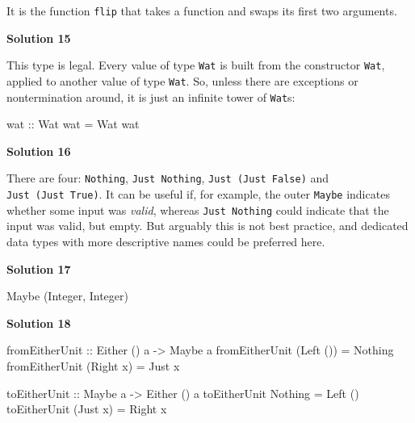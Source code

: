 \documentclass[11pt,
  american,
  DIV13]{article}
\newenvironment{Shaded}{}{}
\newcommand{\DataTypeTok}[1]{\textcolor[rgb]{0.56,0.13,0.00}{#1}}
\newcommand{\NormalTok}[1]{#1}
\newcommand{\OtherTok}[1]{\textcolor[rgb]{0.00,0.44,0.13}{#1}}
\begin{document}
It is the function \texttt{flip} that takes a function and swaps its
first two arguments.

\textbf{Solution 15}

This type is legal. Every value of type \texttt{Wat} is built from the
constructor \texttt{Wat}, applied to another value of type \texttt{Wat}.
So, unless there are exceptions or nontermination around, it is just an
infinite tower of \texttt{Wat}s:

\begin{Shaded}
\begin{Highlighting}[]
\OtherTok{wat ::} \DataTypeTok{Wat}
\NormalTok{wat }\OtherTok{=} \DataTypeTok{Wat}\NormalTok{ wat}
\end{Highlighting}
\end{Shaded}

\textbf{Solution 16}

There are four: \texttt{Nothing}, \texttt{Just\ Nothing},
\texttt{Just\ (Just\ False)} and \texttt{Just\ (Just\ True)}. It can be
useful if, for example, the outer \texttt{Maybe} indicates whether some
input was \emph{valid}, whereas \texttt{Just\ Nothing} could indicate
that the input was valid, but empty. But arguably this is not best
practice, and dedicated data types with more descriptive names could be
preferred here.

\textbf{Solution 17}

\begin{Shaded}
\begin{Highlighting}[]
\DataTypeTok{Maybe}\NormalTok{ (}\DataTypeTok{Integer}\NormalTok{, }\DataTypeTok{Integer}\NormalTok{)}
\end{Highlighting}
\end{Shaded}

\textbf{Solution 18}

\begin{Shaded}
\begin{Highlighting}[]
\OtherTok{fromEitherUnit ::} \DataTypeTok{Either}\NormalTok{ () a }\OtherTok{{-}\textgreater{}} \DataTypeTok{Maybe}\NormalTok{ a}
\NormalTok{fromEitherUnit (}\DataTypeTok{Left}\NormalTok{ ()) }\OtherTok{=} \DataTypeTok{Nothing}
\NormalTok{fromEitherUnit (}\DataTypeTok{Right}\NormalTok{ x) }\OtherTok{=} \DataTypeTok{Just}\NormalTok{ x}

\OtherTok{toEitherUnit ::} \DataTypeTok{Maybe}\NormalTok{ a }\OtherTok{{-}\textgreater{}} \DataTypeTok{Either}\NormalTok{ () a}
\NormalTok{toEitherUnit }\DataTypeTok{Nothing} \OtherTok{=} \DataTypeTok{Left}\NormalTok{ ()}
\NormalTok{toEitherUnit (}\DataTypeTok{Just}\NormalTok{ x) }\OtherTok{=} \DataTypeTok{Right}\NormalTok{ x}
\end{Highlighting}
\end{Shaded}
\end{document}
